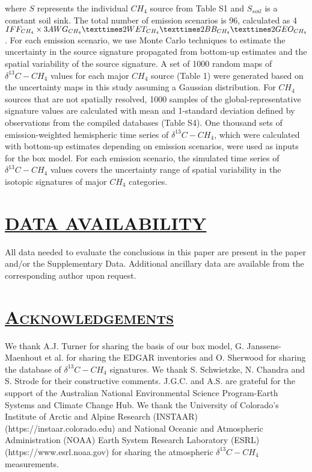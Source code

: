 \documentclass[a4paper,12pt]{article}
\begin{document}
{\small{where $S$ represents the individual $CH_4$ source from Table S1 and $S_{soil}$ is a constant soil sink. The total number of emission scenarios is 96, calculated as 4 $IFF_{CH_4} \times 3 AWG_{CH_4} × 2 WET_{CH_4} × \\2 BB_{CH_4} × 2 GEO_{CH_4}$. For each emission scenario, we use Monte Carlo techniques to estimate the uncertainty in the source signature propagated from bottom-up estimates and the spatial variability of the source signature. A set of 1000 random maps of $\delta^{13}C-CH_4$ values for each major $CH_4$ source (Table 1) were generated based on the uncertainty maps in this study assuming a Gaussian distribution. For $CH_4$ sources that are not spatially resolved, 1000 samples of the global-representative signature values are calculated with mean and 1-standard deviation defined by observations from the compiled databases (Table S4). One thousand sets of emission-weighted hemispheric time series of $\delta^{13}C-CH_4$, which were calculated with bottom-up estimates depending on emission scenarios, were used as inputs for the box model. For each emission scenario, the simulated time series of $\delta^{13}C-CH_4$ values covers the uncertainty range of spatial variability in the isotopic signatures of major $CH_4$ categories.}


\section*{\textbf{\textsc{\Large{\underline{DATA AVAILABILITY}}}}}

\small{All data needed to evaluate the conclusions in this paper are present in the paper and/or the Supplementary Data. Additional ancillary data are available from the corresponding author upon request.}

\section*{\textbf{\textsc{\Large{\underline{Acknowledgements}}}}}

\small{We thank A.J. Turner for sharing the basis of our box model, G. Janssens-Maenhout et al. for sharing the EDGAR inventories and O. Sherwood for sharing the database of $\delta^{13}C-CH_4$ signatures. We thank S. Schwietzke, N. Chandra and S. Strode for their constructive comments. J.G.C. and A.S. are grateful for the support of the Australian National Environmental Science Program-Earth Systems and Climate Change Hub. We thank the University of Colorado's Institute of Arctic and Alpine Research (INSTAAR) (https://instaar.colorado.edu) and National Oceanic and Atmospheric Administration (NOAA) Earth System Research Laboratory (ESRL) (https://www.esrl.noaa.gov) for sharing the atmospheric $\delta^{13}C-CH_4$ measurements.}

}
\end{document}
